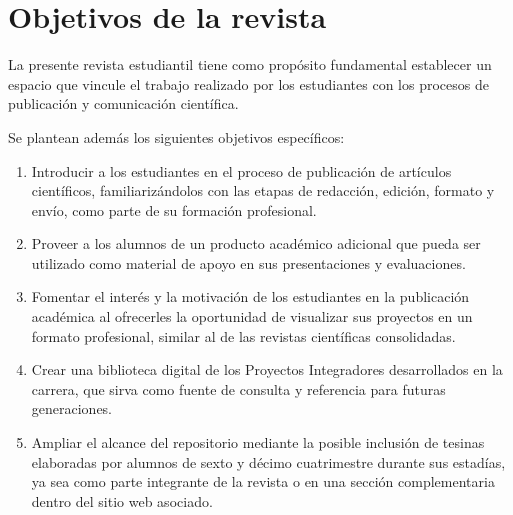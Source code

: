 \chapter{Objetivos de la revista}

La presente revista estudiantil tiene como propósito fundamental establecer un espacio que vincule el trabajo realizado por los estudiantes con los procesos de publicación y comunicación científica.

Se plantean además los siguientes objetivos específicos:

\begin{enumerate}
    \item Introducir a los estudiantes en el proceso de publicación de artículos científicos, familiarizándolos con las etapas de redacción, edición, formato y envío, como parte de su formación profesional.

    \item Proveer a los alumnos de un producto académico adicional que pueda ser utilizado como material de apoyo en sus presentaciones y evaluaciones.

    \item Fomentar el interés y la motivación de los estudiantes en la publicación académica al ofrecerles la oportunidad de visualizar sus proyectos en un formato profesional, similar al de las revistas científicas consolidadas.

    \item Crear una biblioteca digital de los Proyectos Integradores desarrollados en la carrera, que sirva como fuente de consulta y referencia para futuras generaciones.

    \item Ampliar el alcance del repositorio mediante la posible inclusión de tesinas elaboradas por alumnos de sexto y décimo cuatrimestre durante sus estadías, ya sea como parte integrante de la revista o en una sección complementaria dentro del sitio web asociado.
\end{enumerate}